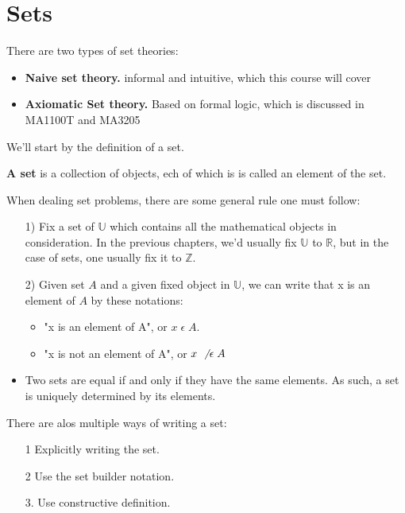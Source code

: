 \documentclass[a4paper]{article}
\begin{document}
\section{Sets}
There are two types of set theories:
\begin{itemize}
	\item \textbf{Naive set theory.} informal and intuitive, which this course will cover
		\item \textbf{Axiomatic Set theory.} Based on formal logic, which is discussed in MA1100T and MA3205
\end{itemize}
We'll start by the definition of a set.
\begin{tcolorbox}
\textbf{A set} is a collection of objects, ech of which is is called an element of the set.
\end{tcolorbox}
When dealing set problems, there are some general rule one must follow:
\begin{itemize}
	\item[1)] Fix a set of $\mathbb{U}$ which contains all the mathematical objects in consideration. In the previous chapters, we'd usually fix  $\mathbb{U}$ to  $\mathbb{R}$, but in the case of sets, one usually fix it to $\mathbb{Z}$. \\ 
	\item[2)] Given set $A$ and a given fixed object in $\mathbb{U}$, we can write that x is an element of $A$ by these notations: \\
		\begin{itemize}
			\item "x is an element of A", or $x \; \epsilon \; A$. \\
			\item "x is not an element of A", or $x \; \not \; \epsilon \; A$ \\
		\end{itemize}
		\item Two sets are equal if and only if they have the same elements. As such, a set is uniquely determined by its elements. \\
\end{itemize}

There are alos multiple ways of writing a set:
\begin{itemize}
	\item[1] Explicitly writing the set.
	\item[2] Use the set builder notation.
	\item[3.] Use constructive definition.
\end{itemize}
\end{document}
